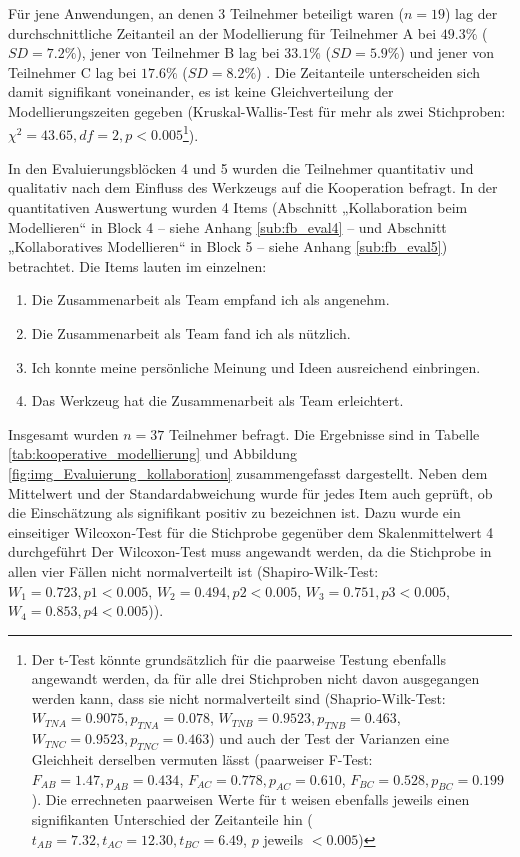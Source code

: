 Für jene Anwendungen, an denen 3 Teilnehmer beteiligt waren ($n=19$) lag der durchschnittliche Zeitanteil an der Modellierung für Teilnehmer A bei $49.3\%$ ($SD=7.2\%$), jener von Teilnehmer B lag bei $33.1\%$ ($SD=5.9\%$) und jener von Teilnehmer C lag bei $17.6\%$ ($SD=8.2\%$) . Die Zeitanteile unterscheiden sich damit signifikant voneinander, es ist keine Gleichverteilung der Modellierungszeiten gegeben (Kruskal-Wallis-Test für mehr als zwei Stichproben: $\chi^{2}=43.65, df=2, p<0.005$\footnote{Der t-Test könnte grundsätzlich für die paarweise Testung ebenfalls angewandt werden, da für alle drei Stichproben nicht davon ausgegangen werden kann, dass sie nicht normalverteilt sind (Shaprio-Wilk-Test: $W_{TN A}=0.9075, p_{TN A}=0.078$, $W_{TN B}=0.9523, p_{TN B}=0.463$, $W_{TN C}=0.9523, p_{TN C}=0.463$) und auch der Test der Varianzen eine Gleichheit derselben vermuten lässt (paarweiser F-Test: $F_{AB}=1.47, p_{AB}=0.434$, $F_{AC}=0.778, p_{AC}=0.610$, $F_{BC}=0.528, p_{BC}=0.199$). Die errechneten paarweisen Werte für t weisen ebenfalls jeweils einen signifikanten Unterschied der Zeitanteile hin ($t_{AB}=7.32, t_{AC}=12.30, t_{BC}=6.49$, $p$ jeweils $<0.005$)}).

In den Evaluierungsblöcken 4 und 5 wurden die Teilnehmer quantitativ und qualitativ nach dem Einfluss des Werkzeugs auf die Kooperation befragt. In der quantitativen Auswertung wurden 4 Items (Abschnitt „Kollaboration beim Modellieren“ in Block 4 -- siehe Anhang \ref{sub:fb_eval4} -- und Abschnitt „Kollaboratives Modellieren“ in Block 5 -- siehe Anhang \ref{sub:fb_eval5}) betrachtet. Die Items lauten im einzelnen:

\begin{enumerate}
	\item Die Zusammenarbeit als Team empfand ich als angenehm.
	\item Die Zusammenarbeit als Team fand ich als nützlich.
	\item Ich konnte meine persönliche Meinung und Ideen ausreichend einbringen.
	\item Das Werkzeug hat die Zusammenarbeit als Team erleichtert.
\end{enumerate}

Insgesamt wurden $n=37$ Teilnehmer befragt. Die Ergebnisse sind in Tabelle \ref{tab:kooperative_modellierung} und Abbildung \ref{fig:img_Evaluierung_kollaboration} zusammengefasst dargestellt. Neben dem Mittelwert und der Standardabweichung wurde für jedes Item auch geprüft, ob die Einschätzung als signifikant positiv zu bezeichnen ist. Dazu wurde ein einseitiger Wilcoxon-Test für die Stichprobe gegenüber dem Skalenmittelwert 4 durchgeführt {Der Wilcoxon-Test muss angewandt werden, da die Stichprobe in allen vier Fällen nicht normalverteilt ist (Shapiro-Wilk-Test: $W_{1}=0.723, p{1}<0.005$, $W_{2}=0.494, p{2}<0.005$, $W_{3}=0.751, p{3}<0.005$, $W_{4}=0.853, p{4}<0.005$)}).

